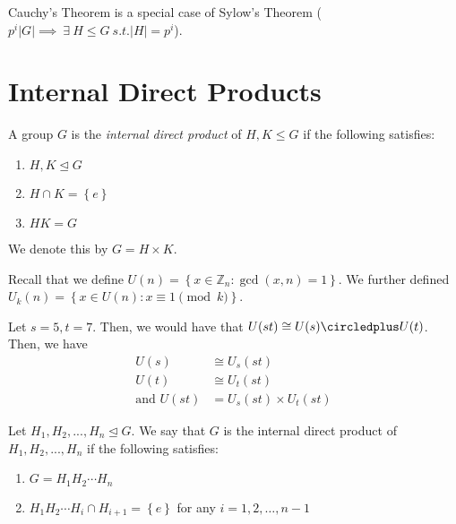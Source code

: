 \begin{remark}
    Cauchy's Theorem is a special case of Sylow's Theorem (\(p^i|G| \implies \ \exists \  H \leq G\ s.t. |H| = p^i\)). 
\end{remark}

\section{Internal Direct Products}

\begin{definition}
    A group \(G\) is the \textit{internal direct product} of \(H, K \leq G\) if the following satisfies:
    \begin{enumerate}
        \item \(H, K \unlhd G\)
        \item \(H \cap K = \left\{e\right\}\)
        \item \(HK = G\)
    \end{enumerate}
    We denote this by \(G = H \times K\).
\end{definition}

\begin{nexample}
    Recall that we define \(U(n) = \left\{x \in \mathbb{Z}_n : \gcd(x, n) = 1\right\}\). We further defined \(U_k(n) = \left\{{x} \in U(n) : x \equiv 1 \pmod k\right\}\).

    Let \(s = 5, t = 7\). Then, we would have that \(U(st) \cong U(s) \circledplus U(t)\). Then, we have
    \[
    \begin{aligned}
        U(s) &\cong U_s(st) \\
        U(t) &\cong U_t(st) \\
        \text{and } U(st) &= U_s(st) \times U_t(st)
    \end{aligned}
    \]
\end{nexample}

\begin{definition}
    Let \(H_1, H_2, ..., H_n \unlhd G\). We say that \(G\) is the internal direct product of \(H_1, H_2, ..., H_n\) if the following satisfies:
    \begin{enumerate}
        \item \(G = H_1 H_2 \cdots H_n\)
        \item \(H_1 H_2 \cdots H_i \cap H_{i+1} = \left\{e\right\}\) for any \(i = 1, 2, \ldots, n-1\)
    \end{enumerate}
\end{definition}

